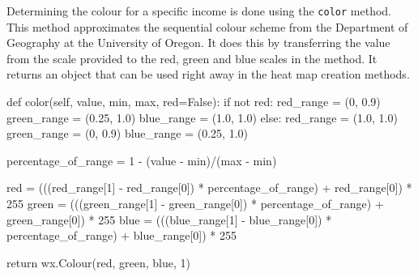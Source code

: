 \par
Determining the colour for a specific income is done using the \texttt{color} method. This method approximates the sequential colour scheme from the Department of Geography at the University of Oregon\cite{dog-uoo}. It does this by transferring the value from the scale provided to the red, green and blue scales in the method. It returns an object that can be used right away in the heat map creation methods.

\begin{code}[language=Python]
def color(self, value, min, max, red=False):
	if not red:
	    red_range = (0, 0.9)
	    green_range = (0.25, 1.0)
	    blue_range = (1.0, 1.0)
	else:
	    red_range = (1.0, 1.0)
	    green_range = (0, 0.9)
	    blue_range = (0.25, 1.0)
	
	percentage_of_range = 1 - (value - min)/(max - min)
	
	red = (((red_range[1] - red_range[0]) * percentage_of_range) + red_range[0]) * 255
	green = (((green_range[1] - green_range[0]) * percentage_of_range) + green_range[0]) * 255
	blue = (((blue_range[1] - blue_range[0]) * percentage_of_range) + blue_range[0]) * 255
	
	return wx.Colour(red, green, blue, 1)
\end{code}




